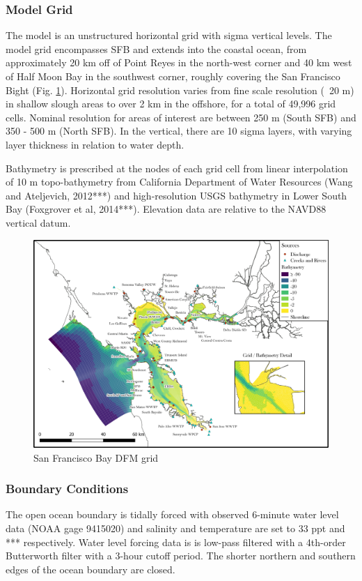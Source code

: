 \documentclass[preprint,review,12pt]{elsarticle}
\begin{document}
\subsubsection{Model Grid}
The model is an unstructured horizontal grid with sigma vertical levels. The model grid encompasses SFB and extends into the coastal ocean, from approximately 20 km off of Point Reyes in the north-west corner and 40 km west of Half Moon Bay in the southwest corner, roughly covering the San Francisco Bight (Fig. \ref{fig:grid}). Horizontal grid resolution varies from fine scale resolution (~20 m) in shallow slough areas to over 2 km in the offshore, for a total of 49,996 grid cells. Nominal resolution for areas of interest are between 250 m (South SFB) and 350 - 500 m (North SFB). In the vertical, there are 10 sigma layers, with varying layer thickness in relation to water depth. 

Bathymetry is prescribed at the nodes of each grid cell from linear interpolation of 10 m topo-bathymetry from California Department of Water Resources (Wang and Ateljevich, 2012***) and high-resolution USGS bathymetry in Lower South Bay (Foxgrover et al, 2014***). Elevation data are relative to the NAVD88 vertical datum. 

\begin{figure}[ht!]
\centering
\includegraphics[width=\textwidth]{Figures/grid_inputs_v21.png}
\caption{San Francisco Bay DFM grid}
\label{fig:grid}
\end{figure}
\FloatBarrier

\subsubsection{Boundary Conditions}
The open ocean boundary is tidally forced with observed 6-minute water level data (NOAA gage 9415020) and salinity and temperature are set to 33 ppt and *** respectively. Water level forcing data is is low-pass filtered with a 4th-order Butterworth filter with a 3-hour cutoff period. The shorter northern and southern edges of the ocean boundary are closed.
\end{document}
